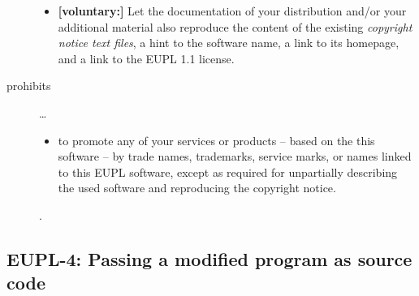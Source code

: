 \begin{description}
\begin{itemize}
  \item \textbf{[voluntary:]} Let the documentation of your distribution and/or
  your additional material also reproduce the content of the existing
  \emph{copyright notice text files}, a hint to the software name, a link to its
  homepage, and a link to the EUPL 1.1 license.
\end{itemize}

\item[prohibits] \ldots
\begin{itemize}
  \item to promote any of your services or products -- based on the this software
  -- by trade names, trademarks, service marks, or names linked to this EUPL
  software, except as required for unpartially describing the used software and
  reproducing the copyright notice.
\end{itemize}.

\end{description}

\subsection{EUPL-4: Passing a modified program as source code}
\label{OSUC-04-EUPL} 

